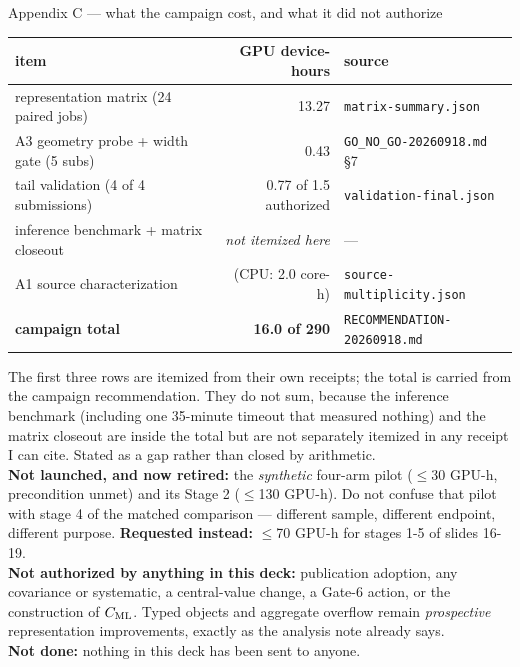 \documentclass[aspectratio=169,10pt]{beamer}
\newcommand{\warn}[1]{\textcolor{warn}{#1}}
\begin{document}
\begin{frame}{Appendix C --- what the campaign cost, and what it did not authorize}
  \begin{center}\small
  \begin{tabular}{@{}lrl@{}}
    \toprule
    item & GPU device-hours & source \\
    \midrule
    representation matrix (24 paired jobs) & 13.27 &
      \texttt{matrix-summary.json} \\
    A3 geometry probe + width gate (5 subs) & 0.43 &
      \texttt{GO\_NO\_GO-20260918.md} \S7 \\
    tail validation (4 of 4 submissions) & 0.77 of 1.5 authorized &
      \texttt{validation-final.json} \\
    inference benchmark + matrix closeout & \emph{not itemized here} & --- \\
    A1 source characterization & (CPU: 2.0 core-h) & \texttt{source-multiplicity.json} \\
    \midrule
    \textbf{campaign total} & \textbf{16.0 of 290} &
      \texttt{RECOMMENDATION-20260918.md} \\
    \bottomrule
  \end{tabular}
  \end{center}
  \vspace{0.3em}
  {\footnotesize \warn{The first three rows are itemized from their own receipts; the
  total is carried from the campaign recommendation. They do not sum, because the
  inference benchmark (including one 35-minute timeout that measured nothing) and the
  matrix closeout are inside the total but are not separately itemized in any receipt I
  can cite. Stated as a gap rather than closed by arithmetic.}
  \\[0.5em]
  \textbf{Not launched, and now retired:} the \emph{synthetic} four-arm pilot
  ($\le$30 GPU-h, precondition unmet) and its Stage 2 ($\le$130 GPU-h). \warn{Do not
  confuse that pilot with stage 4 of the matched comparison} --- different sample,
  different endpoint, different purpose. \textbf{Requested instead:} $\le$70 GPU-h for
  stages 1-5 of slides 16-19.
  \\[0.3em]
  \textbf{Not authorized by anything in this deck:} publication adoption, any covariance
  or systematic, a central-value change, a Gate-6 action, or the construction of
  $C_{\rm ML}$. Typed objects and aggregate overflow remain \emph{prospective}
  representation improvements, exactly as the analysis note already says.
  \\[0.3em]
  \textbf{Not done:} nothing in this deck has been sent to anyone.}
\end{frame}
\end{document}
